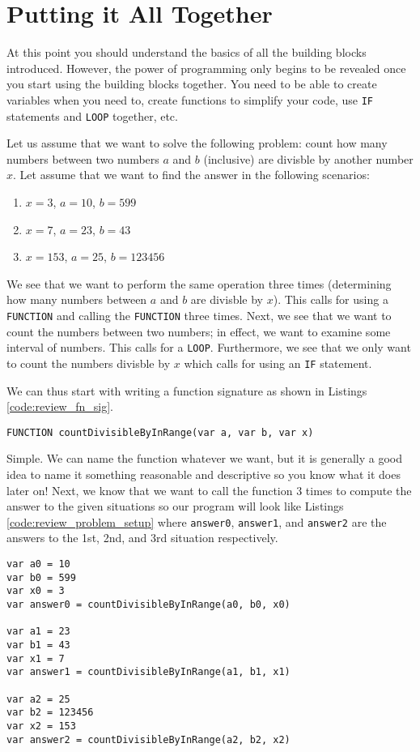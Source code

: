\documentclass{article}
\begin{document}
\section{Putting it All Together}

At this point you should understand the basics of all the building blocks introduced.
However, the power of programming only begins to be revealed once you start using the building blocks together.
You need to be able to create variables when you need to, create functions to simplify your code, use \lstinline{IF} statements and \lstinline{LOOP} together, etc.

Let us assume that we want to solve the following problem: count how many numbers between two numbers $a$ and $b$ (inclusive) are divisble by another number $x$.
Let assume that we want to find the answer in the following scenarios:
\begin{enumerate}
\item $x = 3$, $a = 10$, $b = 599$
\item $x = 7$, $a = 23$, $b = 43$
\item $x = 153$, $a = 25$, $b = 123456$
\end{enumerate}
We see that we want to perform the same operation three times (determining how many numbers between $a$ and $b$ are divisble by $x$).
This calls for using a \lstinline{FUNCTION} and calling the \lstinline{FUNCTION} three times.
Next, we see that we want to count the numbers between two numbers; in effect, we want to examine some interval of numbers.
This calls for a \lstinline{LOOP}.
Furthermore, we see that we only want to count the numbers divisble by $x$ which calls for using an \lstinline{IF} statement.

We can thus start with writing a function signature as shown in Listings \ref{code:review_fn_sig}.
\begin{lstlisting}[caption={Function signature.}, label={code:review_fn_sig}]
FUNCTION countDivisibleByInRange(var a, var b, var x)
\end{lstlisting}
Simple.
We can name the function whatever we want, but it is generally a good idea to name it something reasonable and descriptive so you know what it does later on!
Next, we know that we want to call the function $3$ times to compute the answer to the given situations so our program will look like Listings \ref{code:review_problem_setup} where \lstinline{answer0}, \lstinline{answer1}, and \lstinline{answer2} are the answers to the 1st, 2nd, and 3rd situation respectively.
\begin{lstlisting}[caption={Problem setup.}, label={code:review_problem_setup}]
var a0 = 10
var b0 = 599
var x0 = 3
var answer0 = countDivisibleByInRange(a0, b0, x0)

var a1 = 23
var b1 = 43
var x1 = 7
var answer1 = countDivisibleByInRange(a1, b1, x1)

var a2 = 25
var b2 = 123456
var x2 = 153
var answer2 = countDivisibleByInRange(a2, b2, x2)
\end{lstlisting}
\end{document}

